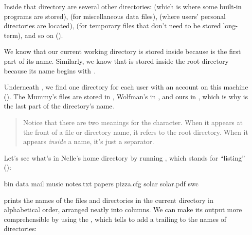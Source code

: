 Inside that directory are several other directories:  (which
is where some built-in programs are stored),  (for
miscellaneous data files),  (where users' personal
directories are located),  (for temporary files that don't
need to be stored long-term), and so on ().


We know that our current working directory  is
stored inside  because  is the first part
of its name. Similarly, we know that  is stored inside
the root directory \code{/} because its name begins with \code{/}.

Underneath , we find one directory for each user with
an account on this machine (). The Mummy's files are
stored in , Wolfman's in ,
and ours in , which is why  is the
last part of the directory's name.


\begin{quote} %
Notice that there are two meanings for the \code{/} character. When it
appears at the front of a file or directory name, it refers to the root
directory. When it appears \emph{inside} a name, it's just a separator.
\end{quote}

Let's see what's in Nelle's home directory by running , which
stands for ``listing'' ():


\begin{VerbOut}
bin          data      mail       music
notes.txt    papers    pizza.cfg  solar
solar.pdf    swc
\end{VerbOut}


 prints the names of the files and directories in the current
directory in alphabetical order, arranged neatly into columns. We can
make its output more comprehensible by using the
 , which tells
 to add a trailing \code{/} to the names of directories:

